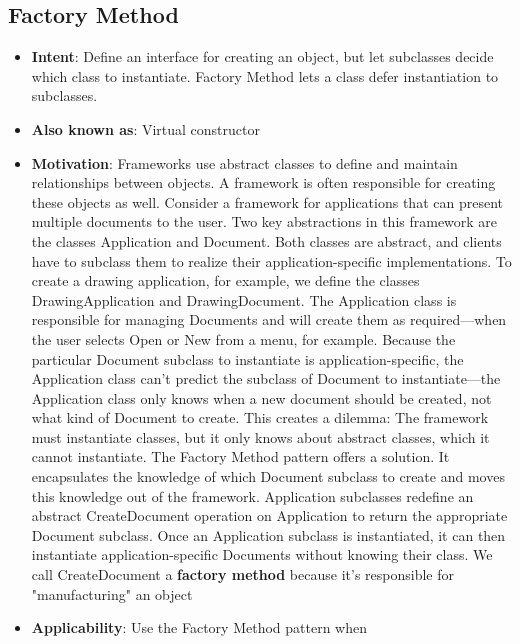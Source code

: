 \documentclass{report}
\begin{document}
    \pagebreak 
    \subsection{Factory Method}
    \begin{itemize}
        \item \textbf{Intent}: Define an interface for creating an object, but let subclasses decide which class to instantiate. Factory Method lets a class defer instantiation to subclasses.
        \item \textbf{Also known as}: Virtual constructor
        \item \textbf{Motivation}: Frameworks use abstract classes to define and maintain relationships between objects. A framework is often responsible for creating these objects as well.
            \bigbreak \noindent 
            Consider a framework for applications that can present multiple documents to the user. Two key abstractions in this framework are the classes Application and Document. Both classes are abstract, and clients have to subclass them to realize their application-specific implementations. To create a drawing application, for example, we define the classes DrawingApplication and DrawingDocument. The Application class is responsible for managing Documents and will create them as required—when the user selects Open or New from a menu, for example.
            \bigbreak \noindent 
            Because the particular Document subclass to instantiate is application-specific, the Application class can't predict the subclass of Document to instantiate—the Application class only knows when a new document should be created, not what kind of Document to create. This creates a dilemma: The framework must instantiate classes, but it only knows about abstract classes, which it cannot instantiate.
            \bigbreak \noindent 
            The Factory Method pattern offers a solution. It encapsulates the knowledge of which Document subclass to create and moves this knowledge out of the framework.
            \bigbreak \noindent 
            \bigbreak \noindent 
            Application subclasses redefine an abstract CreateDocument operation on Application to return the appropriate Document subclass. Once an Application subclass is instantiated, it can then instantiate application-specific Documents without knowing their class. We call CreateDocument a \textbf{factory method} because it's responsible for "manufacturing" an object
        \item \textbf{Applicability}: Use the Factory Method pattern when

\end{itemize}
\end{document}
